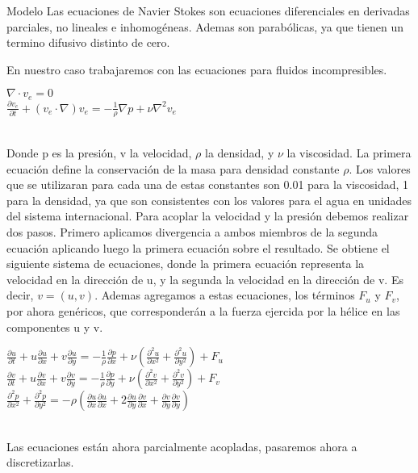 
\begin{section}{Modelo}
Las ecuaciones de Navier Stokes son ecuaciones diferenciales en derivadas parciales, no lineales e inhomogéneas. Ademas son parabólicas, ya que tienen un termino difusivo distinto de cero.

En nuestro caso trabajaremos con las ecuaciones para fluidos incompresibles.
~\\

\begin{center}
$\nabla \cdot v_e = 0$\\
$\frac{\partial v_e}{\partial t} + (v_e \cdot \nabla)v_e = -\frac{1}{\rho}\nabla p+\nu \nabla^2v_e$
\end{center}
~\\

Donde p es la presión, v la velocidad, $\rho$ la densidad, y $\nu$ la viscosidad. La primera ecuación define la conservación de la masa para densidad constante $\rho$. 
Los valores que se utilizaran para cada una de estas constantes son 0.01 para la viscosidad, 1 para la densidad, ya que son consistentes con los valores para el agua en unidades del sistema internacional.
Para acoplar la velocidad y la presión debemos realizar dos pasos. Primero aplicamos divergencia a ambos miembros de la segunda ecuación aplicando luego la primera ecuación sobre el resultado. Se obtiene el siguiente sistema de ecuaciones, donde la primera ecuación representa la velocidad en la dirección de u, y la segunda la velocidad en la dirección de v. Es decir, $v=(u,v)$. Ademas agregamos a estas ecuaciones, los términos $F_u$ y $F_v$, por ahora genéricos, que corresponderán a la fuerza ejercida por la hélice en las componentes u y v.
~\\

\begin{center}

$\frac{\partial u}{\partial t} + u \frac{\partial u}{\partial x} + v \frac{\partial u}{\partial y} = -\frac{1}{\rho} \frac{\partial p}{\partial x} + \nu ( \frac{\partial ^2 u}{\partial x^2} + \frac{\partial ^2 u}{\partial y^2}) + F_u$
~\\
$\frac{\partial v}{\partial t} + u \frac{\partial v}{\partial x} + v \frac{\partial v}{\partial y} = -\frac{1}{\rho} \frac{\partial p}{\partial y} + \nu ( \frac{\partial ^2 v}{\partial x^2} + \frac{\partial ^2 v}{\partial y^2}) + F_v$
~\\
$\frac{\partial ^2 p}{\partial x^2} + \frac{\partial ^2 p}{\partial y^2} = - \rho(\frac{\partial u}{\partial x} \frac{\partial u}{\partial x}  + 2 \frac{\partial u}{\partial y}  \frac{\partial v}{\partial x} + \frac{\partial v}{\partial y} \frac{\partial v}{\partial y}  )$


\end{center}
~\\

Las ecuaciones están ahora parcialmente acopladas, pasaremos ahora a discretizarlas.
\end{section}



